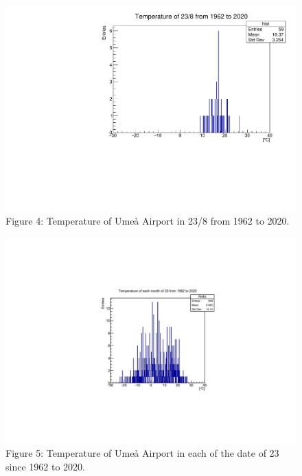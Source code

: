 \documentclass[a4, 12pt]{article}
\begin{document}
\begin{figure}[H]
\centering
\includegraphics[scale=0.6]{chrisFig1.pdf}
\caption*{Figure 4: Temperature of Umeå Airport in 23/8 from 1962 to 2020.}
\end{figure}


\begin{figure}[H]
\centering
\includegraphics[scale=0.7]{chrisFig3.pdf}
\caption*{Figure 5: Temperature of Umeå Airport in each of the date of 23 since 1962 to 2020.}
\end{figure}




\end{document}

